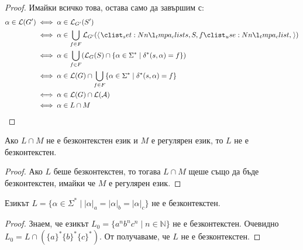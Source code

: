 \begin{proof}
    Имайки всичко това, остава само да завършим с:
    \begin{align*}
        \alpha \in \mathcal{L}(G') & \iff \alpha \in \mathcal{L}_{G'}(S')                                                                                    \\
                                   & \iff \alpha \in \bigcup\limits_{f \in F} \mathcal{L}_{G'}(\opair{s, S, f})                                              \\
                                   & \iff \alpha \in \bigcup\limits_{f \in F} (\mathcal{L}_G(S) \cap \{ \alpha \in \Sigma^* \mid \delta^*(s, \alpha) = f \}) \\
                                   & \iff \alpha \in \mathcal{L}(G) \cap \bigcup\limits_{f \in F} \{ \alpha \in \Sigma^* \mid \delta^*(s, \alpha) = f \}     \\
                                   & \iff \alpha \in \mathcal{L}(G) \cap \mathcal{L(A)}                                                                      \\
                                   & \iff \alpha \in L \cap M
    \end{align*}
\end{proof}

\begin{corollary}
    Ако $L \cap M$ не е безконтекстен език и $M$ е регулярен език, то $L$ не е безконтекстен.
\end{corollary}

\begin{proof}
    Ако $L$ беше безконтекстен, то тогава $L \cap M$ щеше също да бъде безконтекстен, имайки че $M$ е регулярен език.
\end{proof}

\begin{claim}
    Езикът $L = \{ \alpha \in \Sigma^* \mid |\alpha|_a = |\alpha|_b = |\alpha|_c \}$ не е безконтекстен.
\end{claim}

\begin{proof}
    Знаем, че езикът $L_0 = \{ a^nb^nc^n \mid n \in \mathbb{N} \}$ не е безконтекстен.
    Очевидно $L_0 = L \cap (\{ a \}^* \{ b \}^* \{ c \}^*)$.
    От  получаваме, че $L$ не е безконтекстен.
\end{proof}